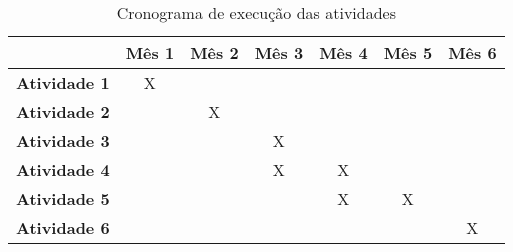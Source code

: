 \begin{table}[h]
	\centering
	\caption{Cronograma de execução das atividades}
	\begin{tabular}{l|c|c|c|c|c|c|}
		\cline{2-7}
		\multicolumn{1}{c|}{} & \textbf{Mês 1} & \textbf{Mês 2} & \textbf{Mês 3} & \textbf{Mês 4} & \textbf{Mês 5} & \textbf{Mês 6} \\ \hline
		\multicolumn{1}{|l|}{\textbf{Atividade 1}} & X &   &   &   &   &   \\ \hline
		\multicolumn{1}{|l|}{\textbf{Atividade 2}} &   & X &   &   &   &   \\ \hline
		\multicolumn{1}{|l|}{\textbf{Atividade 3}} &   &   & X &   &   &   \\ \hline
		\multicolumn{1}{|l|}{\textbf{Atividade 4}} &   &   & X & X &   &   \\ \hline
		\multicolumn{1}{|l|}{\textbf{Atividade 5}} &   &   &   & X & X &   \\ \hline
		\multicolumn{1}{|l|}{\textbf{Atividade 6}} &   &   &   &   &   & X \\ \hline
	\end{tabular}
\end{table}